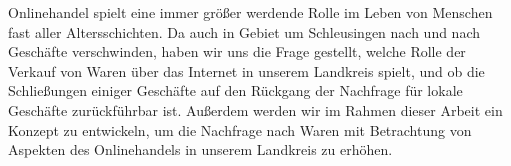 Onlinehandel spielt eine immer größer werdende Rolle im Leben von Menschen fast aller Altersschichten. Da auch in Gebiet um Schleusingen nach und nach Geschäfte verschwinden, haben wir uns die Frage gestellt, welche Rolle der Verkauf von Waren über das Internet in unserem Landkreis spielt, und ob die Schließungen einiger Geschäfte auf den Rückgang der Nachfrage für lokale Geschäfte zurückführbar ist.
Außerdem werden wir im Rahmen dieser Arbeit ein Konzept zu entwickeln, um die Nachfrage nach Waren mit Betrachtung von Aspekten des Onlinehandels in unserem Landkreis zu erhöhen. 